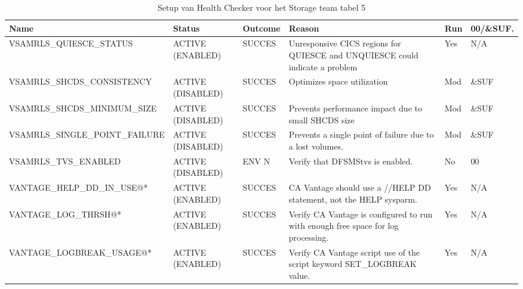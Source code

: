 \begin{landscape}
	\begin{table}[h]
		\begin{tabular}{|l|p{2.3cm}|l|p{4.5cm}|l|l|}
			\hline
			\textbf{Name}                       & \textbf{Status}   & \textbf{Outcome} & \textbf{Reason}    & \textbf{Run} &	\textbf{00/\&SUF.} \\ \hline
			VSAMRLS\_QUIESCE\_STATUS        & ACTIVE (ENABLED)  & SUCCES & Unresponsive   CICS regions for QUIESCE and    UNQUIESCE   could indicate a problem & Yes & N/A   \\ \hline
			VSAMRLS\_SHCDS\_CONSISTENCY     & ACTIVE (DISABLED) & SUCCES & Optimizes   space utilization                                                       & Mod & \&SUF \\ \hline
			VSAMRLS\_SHCDS\_MINIMUM\_SIZE   & ACTIVE (DISABLED) & SUCCES & Prevents   performance impact due to small SHCDS size                               & Mod & \&SUF \\ \hline
			VSAMRLS\_SINGLE\_POINT\_FAILURE & ACTIVE (DISABLED) & SUCCES & Prevents   a single point of failure due to a lost volumes.                         & Mod & \&SUF \\ \hline
			VSAMRLS\_TVS\_ENABLED           & ACTIVE (DISABLED) & ENV N  & Verify that DFSMStvs is enabled.                                                    & No  & 00    \\ \hline
			VANTAGE\_HELP\_DD\_IN\_USE@*    & ACTIVE (ENABLED)  & SUCCES & CA   Vantage should use a //HELP DD statement, not the HELP sysparm.                & Yes & N/A   \\ \hline
			VANTAGE\_LOG\_THRSH@*           & ACTIVE (ENABLED)  & SUCCES & Verify   CA Vantage is configured to run with enough free space for log processing. & Yes & N/A   \\ \hline
			VANTAGE\_LOGBREAK\_USAGE@*      & ACTIVE (ENABLED)  & SUCCES & Verify   CA Vantage script use of the script keyword SET\_LOGBREAK value.           & Yes & N/A   \\ \hline
		\end{tabular}
		\caption[Health Checker Storage team tabel 5]{Setup van Health Checker voor het Storage team tabel 5}
		\label{tbl:Storage Team Tabel 5}
	\end{table}
\end{landscape}

